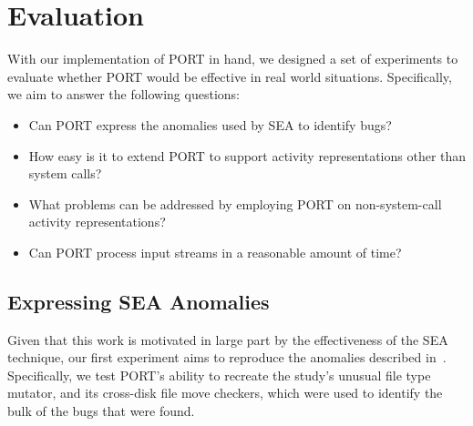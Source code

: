 \section{Evaluation}
\label{SEC:evaluation}

With our implementation of PORT in hand, we designed a set of experiments to evaluate
whether PORT would be effective in real world situations.
Specifically, we aim to answer the following questions:

\begin{itemize}

  \item{Can PORT express the anomalies used by SEA to identify bugs?}

  \item{How easy is it to extend PORT to support activity representations
    other than system calls?}

  \item{What problems can be addressed by employing PORT on
  non-system-call activity representations?}

  \item{Can PORT process input streams in a reasonable amount of time?}

\end{itemize}


\subsection{Expressing SEA Anomalies}
\label{sub:SEAAnomalies}
Given that this work is motivated
in large part
by the effectiveness of the SEA technique,
our first experiment aims to reproduce the anomalies described
in~\cite{DBLP:conf/issre/MooreCFW19}.
Specifically,
we test PORT's ability to recreate
the study's unusual file type mutator,
and its cross-disk file move checkers, which were used to identify
the bulk of the bugs that were found.



